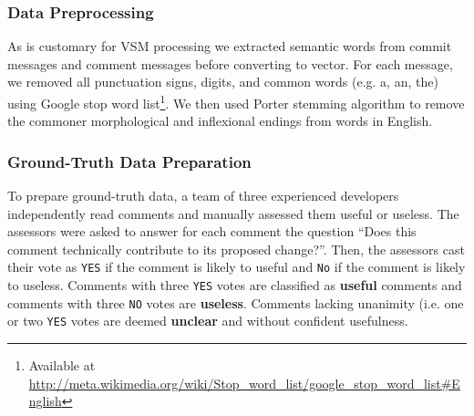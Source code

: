 \subsubsection{Data Preprocessing}
 As is customary for VSM processing we extracted semantic words from commit messages and comment messages before converting to vector. For each message, we removed all punctuation signs, digits, and common words (e.g. a, an, the) using Google stop word list\footnote{Available at \url{http://meta.wikimedia.org/wiki/Stop_word_list/google_stop_word_list#English}}. We then used Porter stemming algorithm to remove the commoner morphological and inflexional endings from words in English.
 





%

\subsubsection{Ground-Truth Data Preparation}
To prepare ground-truth data, a team of three experienced developers independently read comments and manually assessed them useful or useless. The assessors were asked to answer for each comment the question ``Does this comment technically contribute to its proposed change?''. Then, the assessors cast their vote as \texttt{YES} if the comment is likely to useful and \texttt{No} if the comment is likely to useless.  Comments with three \texttt{YES} votes are classified as \textbf{useful} comments and comments with three \texttt{NO} votes are \textbf{useless}. Comments lacking unanimity (i.e. one or two \texttt{YES} votes are deemed \textbf{unclear} and without confident usefulness. 

